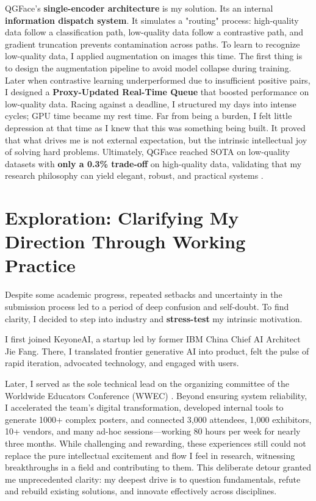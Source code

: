 \documentclass[11pt, letterpaper]{article}
\begin{document}
QGFace's \textbf{single-encoder architecture} is my solution. Its an internal \textbf{information dispatch system}. It simulates a "routing" process: high-quality data follow a classification path, low-quality data follow a contrastive path, and gradient truncation prevents contamination across paths. To learn to recognize low-quality data, I applied augmentation on images this time. The first thing is to design the augmentation pipeline to avoid model collapse during training.
Later when contrastive learning underperformed due to insufficient positive pairs, I designed a \textbf{Proxy-Updated Real-Time Queue} that boosted performance on low-quality data. Racing against a deadline, I structured my days into intense cycles; GPU time became my rest time. Far from being a burden, I felt little depression at that time as I knew that this was something being built. It proved that what drives me is not external expectation, but the intrinsic intellectual joy of solving hard problems. Ultimately, QGFace reached SOTA on low-quality datasets with \textbf{only a 0.3\% trade-off} on high-quality data, validating that my research philosophy can yield elegant, robust, and practical systems \cite{qgface}.

\section{Exploration: Clarifying My Direction Through Working Practice}

Despite some academic progress, repeated setbacks and uncertainty in the submission process led to a period of deep confusion and self-doubt. To find clarity, I decided to step into industry and \textbf{stress-test} my intrinsic motivation.

I first joined KeyoneAI, a startup led by former IBM China Chief AI Architect Jie Fang. There, I translated frontier generative AI into product, felt the pulse of rapid iteration, advocated technology, and engaged with users.

Later, I served as the sole technical lead on the organizing committee of the Worldwide Educators Conference (WWEC) \cite{wwec}. Beyond ensuring system reliability, I accelerated the team's digital transformation, developed internal tools to generate 1000+ complex posters, and connected 3,000 attendees, 1,000 exhibitors, 10+ vendors, and many ad-hoc sessions—working 80 hours per week for nearly three months. While challenging and rewarding, these experiences still could not replace the pure intellectual excitement and flow I feel in research, witnessing breakthroughs in a field and contributing to them. This deliberate detour granted me unprecedented clarity: my deepest drive is to question fundamentals, refute and rebuild existing solutions, and innovate effectively across disciplines.
\end{document}
